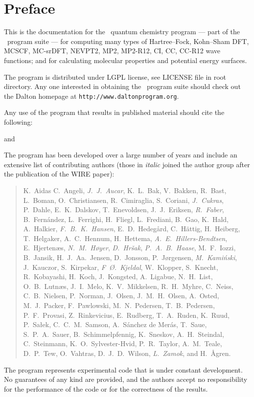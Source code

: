 \tableofcontents

\chapter*{Preface}

This is the documentation for the \dalton\ quantum chemistry program
--- part of the \latestrelease\ program suite ---
for computing many types of Hartree--Fock, Kohn--Sham DFT, 
MCSCF, MC-srDFT, NEVPT2, MP2, MP2-R12, CI, CC, CC-R12 wave functions;
and for calculating molecular properties and potential energy surfaces.


The program is distributed under LGPL license, see LICENSE file in root directory.
Any one interested in obtaining the \latestrelease\ program suite
should check out the Dalton homepage at \verb|http://www.daltonprogram.org|.

Any use of the program that results in published
material should cite the following:
\begin{quote}
\end{quote}
and
\begin{quote}
\end{quote}

The program has been developed over a large number of years and
include an extensive list of contributing authors
(those in {\em italic} joined the author group after the publication of the WIRE paper):

\begin{quote}\raggedright
K.~Aidas
C.~Angeli,
{\em J.~J.~Aucar},
K.~L.~Bak,
V.~Bakken,
R.~Bast,
L.~Boman,
O.~Christiansen,
R.~Cimiraglia,
S.~Coriani,
{\em J.~Cukras},
P.~Dahle,
E.~K.~Dalskov,
T.~Enevoldsen,
J.~J.~Eriksen,
{\em R.~Faber},
B.~Fern\'{a}ndez,
L.~Ferrighi,
H.~Fliegl,
L.~Frediani,
B.~Gao,
K.~Hald,
A.~Halkier,
{\em F.~B.~K.~Hansen},
E.~D.~Hedeg\aa{}rd,
C.~H{\"a}ttig,
H.~Heiberg,
T.~Helgaker,
A.~C.~Hennum,
H.~Hettema,
{\em A.~E.~Hillers-Bendtsen},
E.~Hjerten\ae{}s,
{\em N.~M.~H{\o}yer},
{\em D.~Hr\v{s}ak},
{\em P.~A.~B.~Haase},
M.~F.~Iozzi,
B.~Jansik,
H.~J.~Aa.~Jensen,
D.~Jonsson,
P.~J{\o}rgensen,
{\em M.~Kami{\'n}ski},
J.~Kauczor,
S.~Kirpekar,
{\em F~{\O}.~Kjeldal},
W.~Klopper,
S.~Knecht,
R.~Kobayashi,
H.~Koch,
J.~Kongsted,
A.~Ligabue,
N.~H.~List,
O.~B.~Lutn\ae{}s,
J.~I.~Melo,
K.~V.~Mikkelsen,
R.~H.~Myhre,
C.~Neiss,
C.~B.~Nielsen,
P.~Norman,
J.~Olsen,
J.~M.~H.~Olsen,
A.~Osted,
M.~J.~Packer,
F.~Pawlowski,
M.~N.~Pedersen,
T.~B.~Pedersen,
P.~F.~Provasi,
Z.~Rinkevicius,
E.~Rudberg,
T.~A.~Ruden,
K.~Ruud,
P.~Sa\l{}ek,
C.~C.~M.~Samson,
A.~S\'{a}nchez de Mer\'{a}s,
T.~Saue,
S.~P.~A.~Sauer,
B.~Schimmelpfennig,
K.~Sneskov,
A.~H.~Steindal,
C.~Steinmann,
K.~O.~Sylvester-Hvid,
P.~R.~Taylor,
A.~M.~Teale,
D.~P.~Tew,
O.~Vahtras,
D.~J.~D.~Wilson,
{\em L.~Zamok},
and H.~{\AA}gren.
\end{quote}

          The program represents experimental code that is
under constant development.  No guarantees of any kind are
provided, and the authors accept no responsibility for the
performance of the code or for the correctness of the results.
